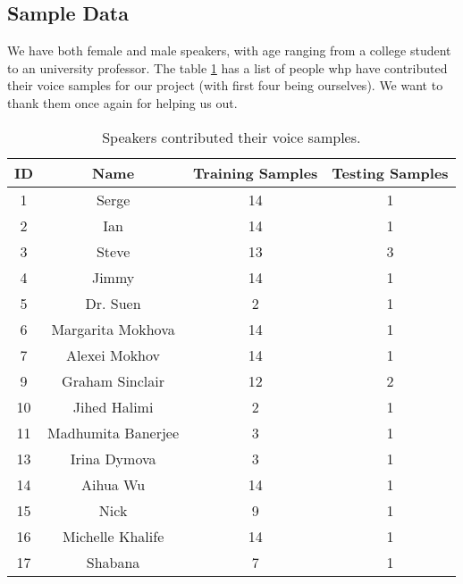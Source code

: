 \subsection{Sample Data}

We have both female and male speakers, with age
ranging from a college student to an university professor.
The table \ref{tab:samples} has a list of people whp have contributed their
voice samples for our project (with first four being ourselves).
We want to thank them once again for helping us
out.

\begin{table}
\begin{minipage}[b]{\textwidth}
\centering
\begin{tabular}{|c|c|c|c|} \hline
ID & Name & Training Samples & Testing Samples\\ \hline\hline
1 & Serge & 14 & 1 \\
2 & Ian & 14 & 1 \\
3 & Steve & 13 & 3 \\
4 & Jimmy & 14 & 1 \\
5 & Dr. Suen & 2 & 1 \\
6 & Margarita Mokhova & 14 & 1 \\
7 & Alexei Mokhov & 14 & 1 \\
9 & Graham Sinclair & 12 & 2 \\
10 & Jihed Halimi & 2 & 1 \\
11 & Madhumita Banerjee & 3 & 1 \\
13 & Irina Dymova & 3 & 1 \\
14 & Aihua Wu & 14 & 1 \\
15 & Nick & 9 & 1 \\
16 & Michelle Khalife & 14 & 1 \\
17 & Shabana & 7 & 1 \\ \hline
\end{tabular}
\end{minipage}
\caption{Speakers contributed their voice samples.}
\label{tab:samples}
\end{table}
